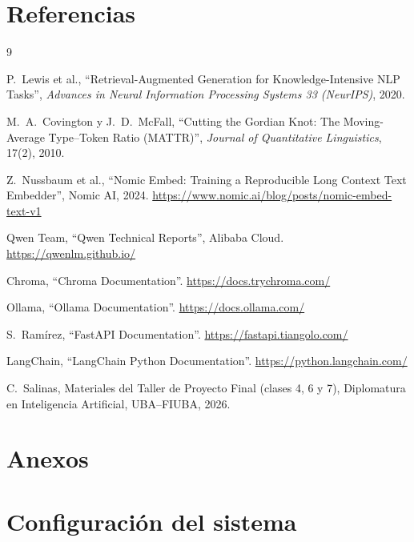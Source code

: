 \documentclass[11pt,a4paper]{article}
\begin{document}
\section{Referencias}

\begin{thebibliography}{9}

P.~Lewis et al., ``Retrieval-Augmented Generation for Knowledge-Intensive
NLP Tasks'', \emph{Advances in Neural Information Processing Systems 33
(NeurIPS)}, 2020.

M.~A.~Covington y J.~D.~McFall, ``Cutting the Gordian Knot: The
Moving-Average Type--Token Ratio (MATTR)'', \emph{Journal of Quantitative
Linguistics}, 17(2), 2010.

Z.~Nussbaum et al., ``Nomic Embed: Training a Reproducible Long Context Text
Embedder'', Nomic AI, 2024. \url{https://www.nomic.ai/blog/posts/nomic-embed-text-v1}

Qwen Team, ``Qwen Technical Reports'', Alibaba Cloud.
\url{https://qwenlm.github.io/}

Chroma, ``Chroma Documentation''. \url{https://docs.trychroma.com/}

Ollama, ``Ollama Documentation''. \url{https://docs.ollama.com/}

S.~Ramírez, ``FastAPI Documentation''. \url{https://fastapi.tiangolo.com/}

LangChain, ``LangChain Python Documentation''.
\url{https://python.langchain.com/}

C.~Salinas, Materiales del Taller de Proyecto Final (clases 4, 6 y 7),
Diplomatura en Inteligencia Artificial, UBA--FIUBA, 2026.

\end{thebibliography}

\appendix
\section*{Anexos}

\section{Configuración del sistema}\label{anexo:config}
\end{document}
